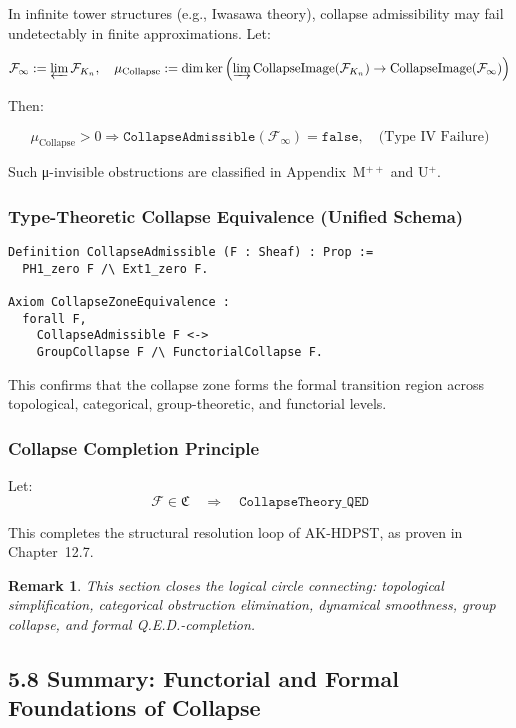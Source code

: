 \documentclass[11pt]{article}
\newtheorem{remark}[theorem]{Remark}
\newcommand{\CollapseImage}{\operatorname{CollapseImage}}
\begin{document}
In infinite tower structures (e.g., Iwasawa theory), collapse admissibility may fail undetectably in finite approximations. Let:

\[
\mathcal{F}_\infty := \varprojlim \mathcal{F}_{K_n}, \quad 
\mu_{\mathrm{Collapse}} := \dim \ker \left( \varinjlim \CollapseImage(\mathcal{F}_{K_n}) \to \CollapseImage(\mathcal{F}_\infty) \right)
\]

Then:

\[
\mu_{\mathrm{Collapse}} > 0 \Rightarrow \texttt{CollapseAdmissible}(\mathcal{F}_\infty) = \texttt{false}, \quad \text{(Type IV Failure)}
\]

Such μ-invisible obstructions are classified in Appendix~M$^{++}$ and U$^+$.

\subsubsection*{Type-Theoretic Collapse Equivalence (Unified Schema)}

\begin{lstlisting}[language=Coq]
Definition CollapseAdmissible (F : Sheaf) : Prop :=
  PH1_zero F /\ Ext1_zero F.

Axiom CollapseZoneEquivalence :
  forall F,
    CollapseAdmissible F <->
    GroupCollapse F /\ FunctorialCollapse F.
\end{lstlisting}

This confirms that the collapse zone forms the formal transition region across topological, categorical, group-theoretic, and functorial levels.

\subsubsection*{Collapse Completion Principle}

Let:
\[
\boxed{
\mathcal{F} \in \mathfrak{C} \quad \Rightarrow \quad \texttt{CollapseTheory\_QED}
}
\]

This completes the structural resolution loop of AK-HDPST, as proven in Chapter~12.7.

\begin{remark}
This section closes the logical circle connecting:  
topological simplification, categorical obstruction elimination, dynamical smoothness, group collapse, and formal Q.E.D.-completion.
\end{remark}

\subsection*{5.8 Summary: Functorial and Formal Foundations of Collapse}
\end{document}
